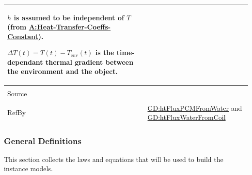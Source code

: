\documentclass[12pt]{article}
\begin{document}
\begin{minipage}{\textwidth}
\begin{tabular}{>{\raggedright}p{}>{\raggedright\arraybackslash}p{}}
        $h$ is assumed to be independent of $T$ (from \hyperref[assumpHTCC]{A:Heat-Transfer-Coeffs-Constant}).
        
        $ΔT\left(t\right)=T\left(t\right)-{T_{\text{env}}}\left(t\right)$ is the time-dependant thermal gradient between the environment and the object.
        
\\ \midrule \\
Source & \cite[(pg. 8)]{incroperaEtAl2007}
         
\\ \midrule \\
RefBy & \hyperref[GD:htFluxPCMFromWater]{GD:htFluxPCMFromWater} and \hyperref[GD:htFluxWaterFromCoil]{GD:htFluxWaterFromCoil}
        
\\ \bottomrule
\end{tabular}
\end{minipage}
\subsubsection{General Definitions}
\label{Sec:GDs}
This section collects the laws and equations that will be used to build the instance models.
\end{document}
